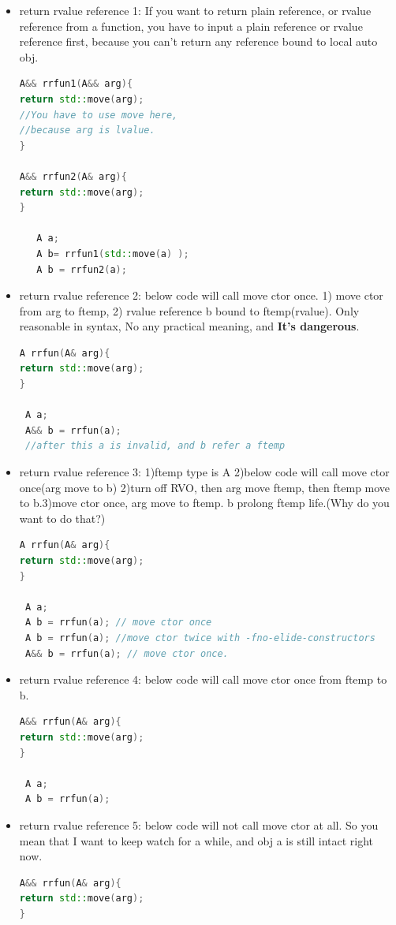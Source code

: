 \documentclass[a4paper,12pt,twoside]{book}
\begin{document}
\begin{itemize}
\item return rvalue reference 1:   If you want to return plain reference, or rvalue reference from a function, you have to input a plain reference or rvalue reference first, because you can't return any reference bound to local auto obj.

\begin{lstlisting}[frame=single, language=c++]
A&& rrfun1(A&& arg){
return std::move(arg);
//You have to use move here,
//because arg is lvalue.
}

A&& rrfun2(A& arg){
return std::move(arg);
}

   A a;
   A b= rrfun1(std::move(a) );
   A b = rrfun2(a);
\end{lstlisting}


\item return rvalue reference 2:   below code will call move ctor once.  1) move ctor from arg to ftemp, 2) rvalue reference b bound to ftemp(rvalue). Only reasonable in syntax, No any practical meaning, and \textbf{It's dangerous}.
\begin{lstlisting}[frame=single, language=c++]
A rrfun(A& arg){
return std::move(arg);
}

 A a;
 A&& b = rrfun(a);
 //after this a is invalid, and b refer a ftemp
\end{lstlisting}

\item return rvalue reference 3:   1)ftemp type is A 2)below code will call move ctor once(arg move to b) 2)turn off RVO, then arg move ftemp, then ftemp move to b.3)move ctor once, arg move to ftemp. b prolong ftemp life.(Why do you want to do that?)
\begin{lstlisting}[frame=single, language=c++]
A rrfun(A& arg){
return std::move(arg);
}

 A a;
 A b = rrfun(a); // move ctor once
 A b = rrfun(a); //move ctor twice with -fno-elide-constructors
 A&& b = rrfun(a); // move ctor once.
\end{lstlisting}

\item return rvalue reference 4:   below code will call move ctor once from ftemp to b.  
\begin{lstlisting}[frame=single, language=c++]
A&& rrfun(A& arg){
return std::move(arg);
}

 A a;
 A b = rrfun(a);
\end{lstlisting}

\item return rvalue reference 5:   below code will not call move ctor at all. So you mean that I want to keep watch for a while, and obj a is still intact right now.
\begin{lstlisting}[frame=single, language=c++]
A&& rrfun(A& arg){
return std::move(arg);
}


\end{lstlisting}
\end{itemize}
\end{document}
